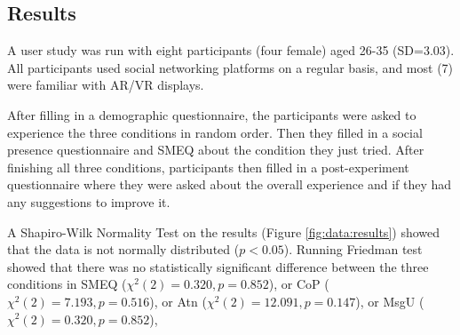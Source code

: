\subsection{Results}

A user study was run with eight participants (four female) aged 26-35 (SD=3.03). All participants used social networking platforms on a regular basis, and most (7) were familiar with AR/VR displays. 

After filling in a demographic questionnaire, the participants were asked to experience the three conditions in random order. Then they filled in a social presence questionnaire and SMEQ about the condition they just tried. After finishing all three conditions, participants then filled in a post-experiment questionnaire where they were asked about the overall experience and if they had any suggestions to improve it. 

A Shapiro-Wilk Normality Test on the results (Figure \ref{fig:data:results}) showed that the data is not normally distributed ($p<0.05$). Running Friedman test showed that there was no statistically significant difference between the three conditions in SMEQ ($\chi^2(2)=0.320, p=0.852$), or CoP ($\chi^2(2)=7.193, p=0.516$), or Atn ($\chi^2(2)=12.091, p=0.147$), or MsgU ($\chi^2(2)=0.320, p=0.852$), 


